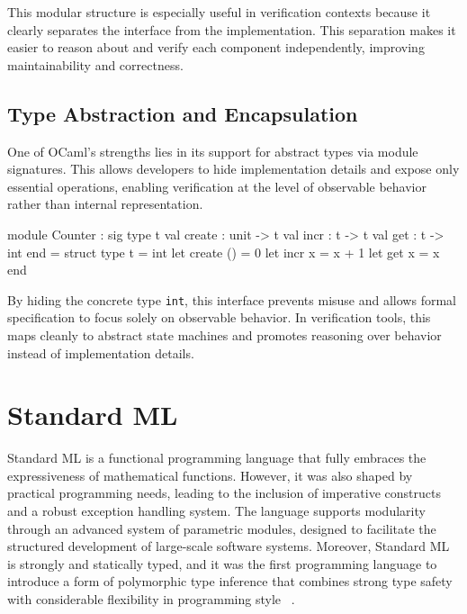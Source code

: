 This modular structure is especially useful in verification contexts because it clearly separates the interface from the 
implementation. This separation makes it easier to reason about and verify each component independently, improving 
maintainability and correctness.

\subsection{Type Abstraction and Encapsulation}

One of OCaml's strengths lies in its support for abstract types via module signatures. This allows developers to hide 
implementation details and expose only essential operations, enabling verification at the level of observable behavior rather 
than internal representation.

\begin{ocamlenv}
  module Counter : sig
    type t
    val create : unit -> t
    val incr : t -> t
    val get : t -> int
  end = struct
    type t = int
    let create () = 0
    let incr x = x + 1
    let get x = x
  end
\end{ocamlenv}

By hiding the concrete type \texttt{int}, this interface prevents misuse and allows formal specification to focus solely on 
observable behavior. In verification tools, this maps cleanly to abstract state machines and promotes reasoning over 
behavior instead of implementation details.



\section{Standard ML}
\label{sec:Standard_ML}

Standard ML is a functional programming language that fully embraces the expressiveness of mathematical functions. 
However, it was also shaped by practical programming needs, leading to the inclusion of imperative constructs and a 
robust exception handling system. The language supports modularity through an advanced system of parametric modules, 
designed to facilitate the structured development of large-scale software systems. Moreover, Standard ML is strongly 
and statically typed, and it was the first programming language to introduce a form of polymorphic type inference that 
combines strong type safety with considerable flexibility in programming style ~\cite{milner1997definition}.

